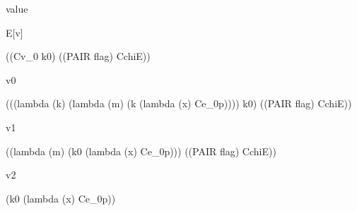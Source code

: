 \documentclass[ms,electronic,twosidetoc,letterpaper,chaptercenter,parttop]{byumsphd}
\begin{document}
\begin{singlespace}
value
\begin{schemedisplay}
E[v]
\end{schemedisplay}

\begin{schemedisplay}
((Cv_0 k0) ((PAIR flag) CchiE))
\end{schemedisplay}

v0
\begin{schemedisplay}
(((lambda (k) (lambda (m) (k (lambda (x) Ce_0p)))) k0) ((PAIR flag) CchiE))
\end{schemedisplay}

v1
\begin{schemedisplay}
((lambda (m) (k0 (lambda (x) Ce_0p))) ((PAIR flag) CchiE))
\end{schemedisplay}

v2
\begin{schemedisplay}
(k0 (lambda (x) Ce_0p))
\end{schemedisplay}
\end{singlespace}



\end{document}
